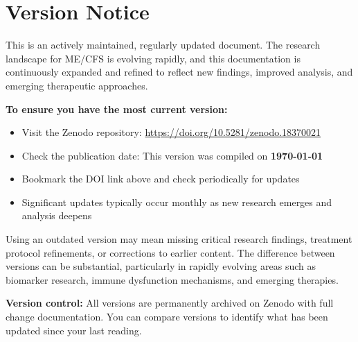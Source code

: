 \chapter*{Version Notice}

\begin{achievement*}
This is an actively maintained, regularly updated document. The research landscape for ME/CFS is evolving rapidly, and this documentation is continuously expanded and refined to reflect new findings, improved analysis, and emerging therapeutic approaches.

\textbf{To ensure you have the most current version:}
\begin{itemize}
\item Visit the Zenodo repository: \url{https://doi.org/10.5281/zenodo.18370021}
\item Check the publication date: This version was compiled on \textbf{\today}
\item Bookmark the DOI link above and check periodically for updates
\item Significant updates typically occur monthly as new research emerges and analysis deepens
\end{itemize}

Using an outdated version may mean missing critical research findings, treatment protocol refinements, or corrections to earlier content. The difference between versions can be substantial, particularly in rapidly evolving areas such as biomarker research, immune dysfunction mechanisms, and emerging therapies.

\textbf{Version control:} All versions are permanently archived on Zenodo with full change documentation. You can compare versions to identify what has been updated since your last reading.
\end{achievement*}
